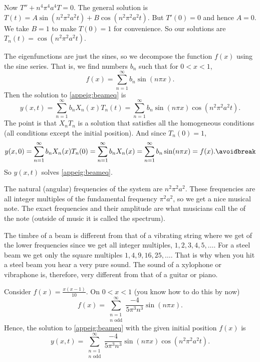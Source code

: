 Now 
$T'' + n^4 \pi^4 a^4 T = 0$.  The general solution is $T(t) =
A \sin (n^2 \pi^2 a^2 t) + B \cos (n^2 \pi^2 a^2 t)$.  But $T'(0) = 0$ and hence
$A=0$.  We take $B=1$ to make $T(0) = 1$ for convenience.
So our solutions are $T_n(t) = \cos (n^2 \pi^2 a^2 t)$.

The eigenfunctions are just the sines, so we decompose the function $f(x)$
using the sine series.  That is,
we find numbers $b_n$ such that for
$0 < x < 1$,
\begin{equation*}
f(x) = \sum_{n=1}^\infty b_n \sin (n \pi x) .
\end{equation*}
Then the solution to \eqref{appeig:beameq} is
\begin{equation*}
y(x,t) = \sum_{n=1}^\infty b_n
X_n(x) T_n(t)
= \sum_{n=1}^\infty b_n
\sin (n \pi x)  \cos ( n^2 \pi^2 a^2 t ) .
\end{equation*}
The point is that $X_nT_n$ is a solution that satisfies all the homogeneous
conditions (all conditions except the initial position).  And since
$T_n(0) = 1$,
\begin{equation*}
y(x,0) = \sum_{n=1}^\infty b_n X_n(x) T_n(0) = 
\sum_{n=1}^\infty b_n X_n(x) =
\sum_{n=1}^\infty b_n
\sin (n \pi x) = f(x) .
\avoidbreak
\end{equation*}
So $y(x,t)$ solves \eqref{appeig:beameq}.

The natural (angular) frequencies of the system are $n^2 \pi^2 a^2$.
These frequencies are all integer multiples of the fundamental frequency
$\pi^2 a^2$, so we get a nice musical note.  The exact frequencies
and their amplitude
are what musicians call the \emph{} of the note (outside
of music it is called the spectrum).

The timbre of a beam
is different from that of a vibrating string where we get 
of the lower frequencies since we get all integer multiples,
$1,2,3,4,5,\ldots$.  For a steel beam we get
only the square multiples $1,4,9,16,25,\ldots$.  That is why when you hit a
steel beam you hear a very pure sound.  The sound of a
xylophone or vibraphone is, therefore, very different from
that of a guitar or piano.

\begin{example}
Consider $f(x) = \frac{x(x-1)}{10}$.  
On $0 < x < 1$ (you know how to do this by now)
\begin{equation*}
f(x) = \sum_{\substack{n=1\\n \text{~odd}}}^\infty \frac{-4}{5\pi^3 n^3}
\sin (n \pi x) .
\end{equation*}
Hence, the solution to \eqref{appeig:beameq} with the given initial
position $f(x)$ is
\begin{equation*}
y(x,t) = \sum_{\substack{n=1\\n \text{~odd}}}^\infty \frac{-4}{5\pi^3 n^3}
\sin (n \pi x) \cos ( n^2 \pi^2 a^2 t ) .
\end{equation*}
\end{example}

